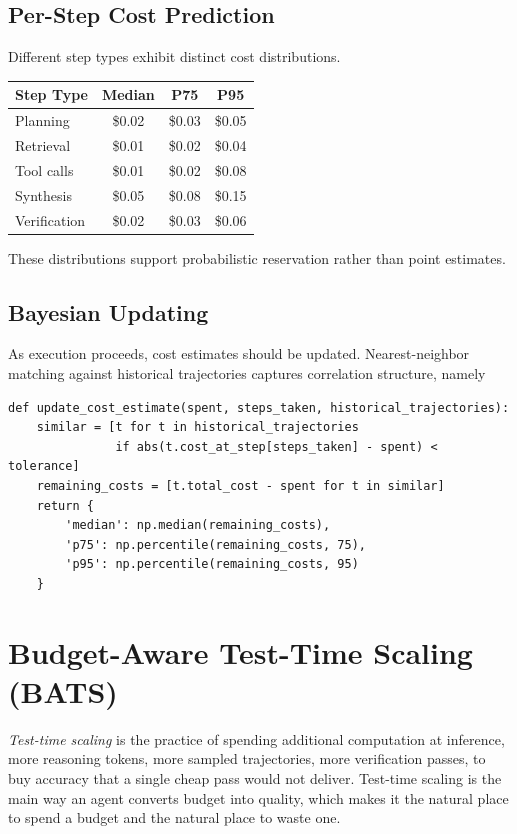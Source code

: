 \subsection{Per-Step Cost Prediction}

Different step types exhibit distinct cost distributions.

\begin{center}
\begin{tabular}{lccc}
\toprule
Step Type & Median & P75 & P95 \\
\midrule
Planning & \$0.02 & \$0.03 & \$0.05 \\
Retrieval & \$0.01 & \$0.02 & \$0.04 \\
Tool calls & \$0.01 & \$0.02 & \$0.08 \\
Synthesis & \$0.05 & \$0.08 & \$0.15 \\
Verification & \$0.02 & \$0.03 & \$0.06 \\
\bottomrule
\end{tabular}
\end{center}

These distributions support probabilistic reservation rather than point estimates.

\subsection{Bayesian Updating}

As execution proceeds, cost estimates should be updated. Nearest-neighbor matching against historical trajectories captures correlation structure, namely {\footnotesize
\begin{verbatim}
def update_cost_estimate(spent, steps_taken, historical_trajectories):
    similar = [t for t in historical_trajectories
               if abs(t.cost_at_step[steps_taken] - spent) < tolerance]
    remaining_costs = [t.total_cost - spent for t in similar]
    return {
        'median': np.median(remaining_costs),
        'p75': np.percentile(remaining_costs, 75),
        'p95': np.percentile(remaining_costs, 95)
    }
\end{verbatim}
}

\section{Budget-Aware Test-Time Scaling (BATS)}

\emph{Test-time scaling} is the practice of spending additional computation at inference, more reasoning tokens, more sampled trajectories, more verification passes, to buy accuracy that a single cheap pass would not deliver. Test-time scaling is the main way an agent converts budget into quality, which makes it the natural place to spend a budget and the natural place to waste one.

